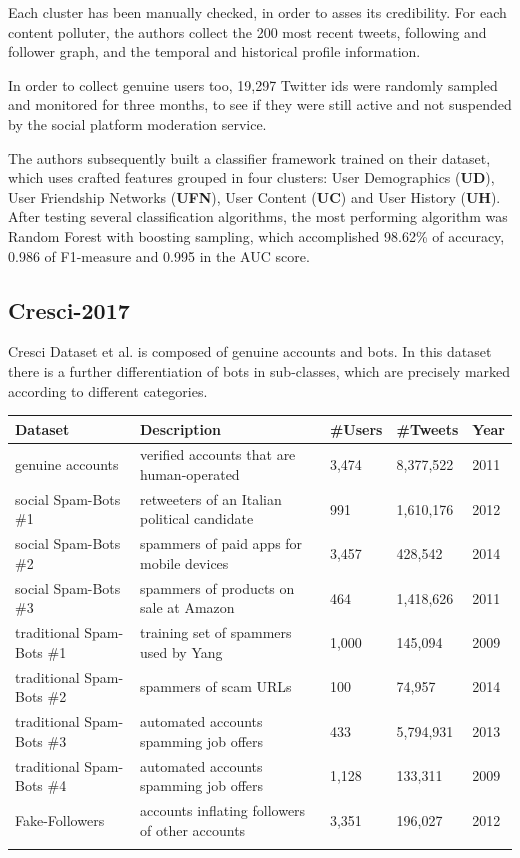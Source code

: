 Each cluster has been manually checked, in order to asses its credibility.
For each content polluter, the authors collect the 200 most recent tweets, following and follower graph, and the temporal and historical profile information.

In order to collect genuine users too, 19,297 Twitter ids were randomly sampled and monitored  for three months, to see if they were still active and not suspended by the social platform moderation service.

The authors subsequently built a classifier framework trained on their dataset, which uses crafted features grouped in four clusters:
User Demographics (\textbf{UD}), User Friendship Networks (\textbf{UFN}), User Content (\textbf{UC}) and User History (\textbf{UH}).
After testing several classification algorithms, the most performing algorithm was Random Forest with boosting sampling, which accomplished 98.62\% of accuracy, 0.986 of F1-measure and 0.995 in the AUC score.

\subsection{Cresci-2017}
Cresci Dataset et al. \cite{Cresci} is composed of genuine accounts and bots. In this dataset there is a further differentiation of bots in sub-classes, which are precisely marked according to different categories.

\tiny
\begin{center}
\begin{tabular}{lllll}
	Dataset&Description&\#Users&\#Tweets&Year\\ \hline\hline
	genuine accounts&
	verified accounts that are human-operated&
	3,474&
	8,377,522
	&2011\\
	social Spam-Bots \#1&
	retweeters of an Italian political candidate&
	991&
	1,610,176&
	2012 \\
	social Spam-Bots \#2&
	spammers of paid apps for mobile devices&
	3,457&
	428,542&
	2014 \\
	social Spam-Bots \#3&
	spammers of products on sale at	Amazon&
	464&
	1,418,626&
	2011 \\
	traditional Spam-Bots \#1&
	training set of spammers used by Yang \cite{Yang}&
	1,000&
	145,094&
	2009 \\
	traditional Spam-Bots \#2&
	spammers of scam URLs&
	100&
	74,957&
	2014 \\
	traditional Spam-Bots \#3&
	automated accounts spamming job offers&
	433&
	5,794,931&
	2013 \\
	traditional Spam-Bots \#4&
	automated accounts spamming job offers&
	1,128&
	133,311&
	2009 \\
	Fake-Followers&
	accounts inflating followers of other accounts&
	3,351&
	196,027&
	2012 \\ \hline\\
	
\end{tabular}
\end{center}

